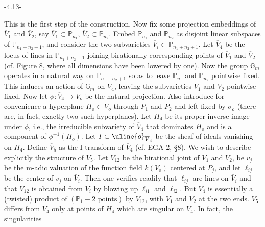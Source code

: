 \begin{center}-4.13-\end{center}
This is the first step of the construction. Now fix some projection embeddings of $\overline V_1$ and $\overline V_2$, say $\overline V_1\subset\mathbb P_{n_1}$, $\overline V_2\subset\mathbb P_{n_2}$. Embed $\mathbb P_{n_1}$ and $\mathbb P_{n_2}$ as disjoint linear subspaces of $\mathbb P_{n_1+n_2+1}$, and consider the two subvarieties $\overline V_i\subset\mathbb P_{n_1+n_2+1}$. Let $\overline V_4$ be the locus of lines in $\mathbb P_{n_1+n_2+1}$ joining birationally corresponding points of $\overline V_1$ and $\overline V_2$ (cf. Figure 8, where all dimensions have been lowered by one). Now the group $\mathbb G_m$ operates in a natural way on $\mathbb P_{n_1+n_2+1}$ so as to leave $\mathbb P_{n_1}$ and $\mathbb P_{n_2}$ pointwise fixed. This induces an action of $\mathbb G_m$ on $\overline V_4$, leaving the subvarieties $\overline V_1$ and $\overline V_2$ pointwise fixed. Now let $\phi:\overline V_4\longrightarrow V_o$ be the natural projection. Also introduce for convenience a hyperplane $H_o\subset V_o$ through $P_1$ and $P_2$ and left fixed by $\sigma_o$ (there are, in fact, exactly two such hyperplanes). Let $H_4$ be its proper inverse image under $\phi$, i.e., the irreducible subvariety of $\overline V_4$ that dominates $H_o$ and is a component of $\phi^{-1}(H_o)$. Let $I\subset\uline{o}_{\overline V_4}$ be the sheaf of ideals vanishing on $H_4$. Define $\overline V_5$ as the I-transform of $\overline V_4$ (cf. EGA 2, \S8). We wish to describe explicitly the structure of $\overline V_5$. Let $\overline V_{12}$ be the birational joint of $\overline V_1$ and $\overline V_2$, be $v_j$ be the m-adic valuation of the function field $k(V_o)$ centered at $P_j$, and let $\ell_{ij}$ be the center of $v_j$ on $\overline V_i$. Then one verifies readily that $\ell_{ij}$ are lines on $\overline V_i$ and that $\overline V_{12}$ is obtained from $\overline V_i$ by blowing up $\ell_{i1}$ and $\ell_{i2}$. But $\overline V_4$ is essentially a (twisted) product of $(\mathbb P_1-2\text{ points})$ by $\overline V_{12}$, with $\overline V_1$ and $\overline V_2$ at the two ends. $\overline V_5$ differs from $\overline V_4$ only at points of $H_4$ which are singular on $\overline V_4$. In fact, the singularities
